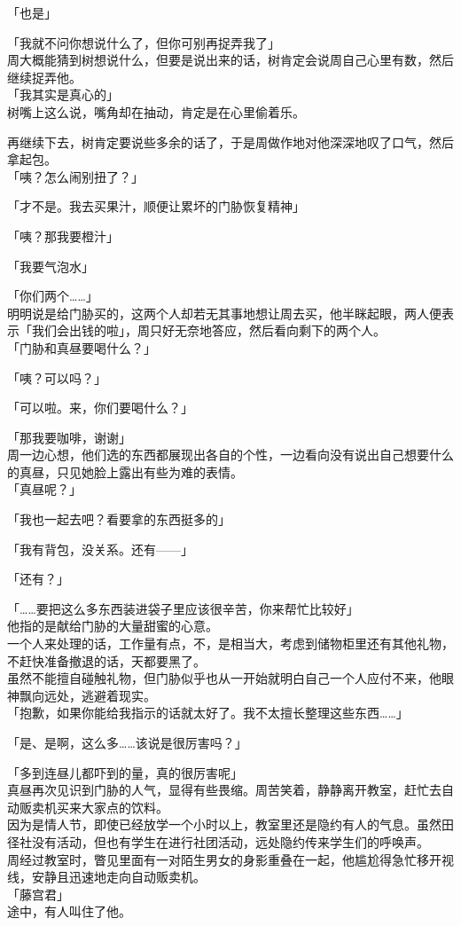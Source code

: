 「也是」

「我就不问你想说什么了，但你可别再捉弄我了」\\

周大概能猜到树想说什么，但要是说出来的话，树肯定会说周自己心里有数，然后继续捉弄他。\\

「我其实是真心的」\\

树嘴上这么说，嘴角却在抽动，肯定是在心里偷着乐。

再继续下去，树肯定要说些多余的话了，于是周做作地对他深深地叹了口气，然后拿起包。\\

「咦？怎么闹别扭了？」

「才不是。我去买果汁，顺便让累坏的门胁恢复精神」

「咦？那我要橙汁」

「我要气泡水」

「你们两个……」\\

明明说是给门胁买的，这两个人却若无其事地想让周去买，他半眯起眼，两人便表示「我们会出钱的啦」，周只好无奈地答应，然后看向剩下的两个人。\\

「门胁和真昼要喝什么？」

「咦？可以吗？」

「可以啦。来，你们要喝什么？」

「那我要咖啡，谢谢」\\

周一边心想，他们选的东西都展现出各自的个性，一边看向没有说出自己想要什么的真昼，只见她脸上露出有些为难的表情。\\

「真昼呢？」

「我也一起去吧？看要拿的东西挺多的」

「我有背包，没关系。还有——」

「还有？」

「……要把这么多东西装进袋子里应该很辛苦，你来帮忙比较好」\\

他指的是献给门胁的大量甜蜜的心意。\\

一个人来处理的话，工作量有点，不，是相当大，考虑到储物柜里还有其他礼物，不赶快准备撤退的话，天都要黑了。\\

虽然不能擅自碰触礼物，但门胁似乎也从一开始就明白自己一个人应付不来，他眼神飘向远处，逃避着现实。\\

「抱歉，如果你能给我指示的话就太好了。我不太擅长整理这些东西……」

「是、是啊，这么多……该说是很厉害吗？」

「多到连昼儿都吓到的量，真的很厉害呢」\\

真昼再次见识到门胁的人气，显得有些畏缩。周苦笑着，静静离开教室，赶忙去自动贩卖机买来大家点的饮料。\\

因为是情人节，即使已经放学一个小时以上，教室里还是隐约有人的气息。虽然田径社没有活动，但也有学生在进行社团活动，远处隐约传来学生们的呼唤声。\\

周经过教室时，瞥见里面有一对陌生男女的身影重叠在一起，他尴尬得急忙移开视线，安静且迅速地走向自动贩卖机。\\

「藤宫君」\\

途中，有人叫住了他。
